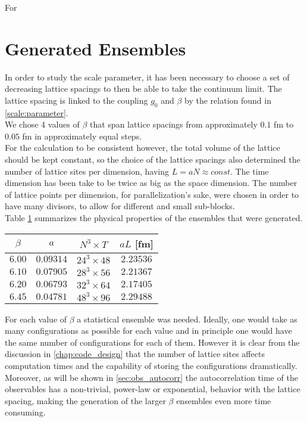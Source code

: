 For 

\section{Generated Ensembles}
In order to study the scale parameter, it has been necessary to choose a set of decreasing lattice spacings to then be able to take the continuum limit. The lattice spacing is linked to the coupling $g_0$ and $\beta$ by the relation found in \cref{scale:parameter}.\\ 
We chose 4 values of $\beta$ that span lattice spacings from approximately $0.1$ fm to $0.05$ fm in approximately equal steps. \\
For the calculation to be consistent however, the total volume of the lattice should be kept constant, so the choice of the lattice spacings also determined the number of lattice sites per dimension, having $L = aN\approx const$. The time dimension has been take to be twice as big as the space dimension. The number of lattice points per dimension, for parallelization's sake, were chosen in order to have many divisors, to allow for different and small sub-blocks. \\
Table \cref{runs:ensembles} summarizes the physical properties of the ensembles that were generated.
\begin{table}[!htb]
    \begin{center}
    \begin{tabular}{cccc}
        $\beta$ & $a$ & $N^3\times T$ & $aL$ [fm]\\\hline
        $6.00$ & $0.09314$ & $24^3 \times 48$ & $2.23536$\\
        $6.10$ & $0.07905$ & $28^3 \times 56$ & $2.21367$\\
        $6.20$ & $0.06793$ & $32^3 \times 64$ & $2.17405$\\
        $6.45$ & $0.04781$ & $48^3 \times 96$ & $2.29488$\\
    \end{tabular}
    \label{runs:ensembles}
    \end{center}
\end{table}
For each value of $\beta$ a statistical ensemble was needed. Ideally, one would take as many configurations as possible for each value and in principle one would have the same number of configurations for each of them. However it is clear from the discussion in \cref{chap:code_design} that the number of lattice sites affects computation times and the capability of storing the configurations dramatically. Moreover, as will be shown in \cref{sec:obs_autocorr} the autocorrelation time of the observables has a non-trivial, power-law or exponential, behavior with the lattice spacing, making the generation of the larger $\beta$ ensembles even more time consuming.\\
